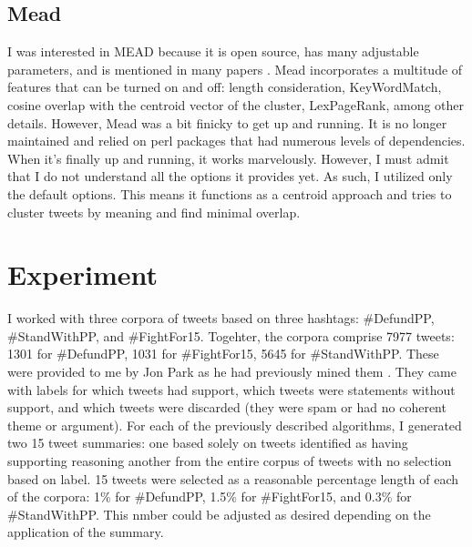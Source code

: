 \documentclass[paper=letter, fontsize=12pt]{article}
\begin{document}
\subsection{Mead}
I was interested in MEAD because it is open source, has many adjustable parameters, and is mentioned in many papers \cite{Radev2004}. Mead incorporates a multitude of features that can be turned on and off: length consideration, KeyWordMatch, cosine overlap with the centroid vector of the cluster, LexPageRank, among other details. However, Mead was a bit finicky to get up and running. It is no longer maintained and relied on perl packages that had numerous levels of dependencies. When it's finally up and running, it works marvelously. However, I must admit that I do not understand all the options it provides yet. As such, I utilized only the default options. This means it functions as a centroid approach and tries to cluster tweets by meaning and find minimal overlap. 

\section{Experiment}
I worked with three corpora of tweets based on three hashtags: \#DefundPP, \#StandWithPP, and \#FightFor15. Togehter, the corpora comprise 7977 tweets: 1301 for \#DefundPP, 1031 for \#FightFor15, 5645 for \#StandWithPP. These were provided to me by Jon Park as he had previously mined them \cite{Acl2016}. They came with labels for which tweets had support, which tweets were statements without support, and which tweets were discarded (they were spam or had no coherent theme or argument). For each of the previously described algorithms, I generated two 15 tweet summaries: one based solely on tweets identified as having supporting reasoning another from the entire corpus of tweets with no selection based on label. 15 tweets were selected as a reasonable percentage length of each of the corpora: 1\% for \#DefundPP, 1.5\% for \#FightFor15, and 0.3\% for \#StandWithPP. This nmber could be adjusted as desired depending on the application of the summary.
\end{document}
